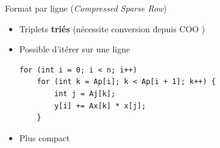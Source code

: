 \documentclass[xcolor={x11names,svgnames}]{beamer}
\begin{document}
\begin{frame}[fragile]
  \begin{exampleblock}{Format \og par ligne\fg{} (\emph{Compressed Sparse Row})}
    \begin{itemize}
    \item Triplets \textbf{triés} (nécessite \alert{conversion} depuis COO )
    \item Possible d'itérer sur une ligne 
\begin{verbatim}
for (int i = 0; i < n; i++)
    for (int k = Ap[i]; k < Ap[i + 1]; k++) {
        int j = Aj[k];
        y[i] += Ax[k] * x[j];
    }
\end{verbatim}
    \item Plus compact 
    \end{itemize}
  \end{exampleblock}
\end{frame}


\end{document}
